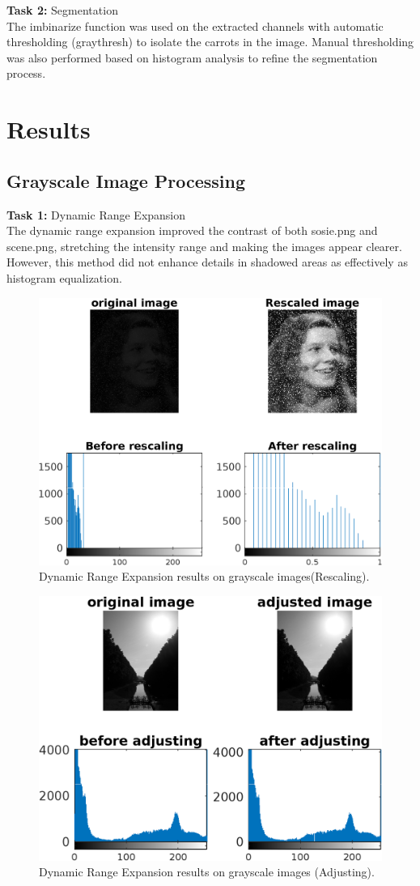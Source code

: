 \documentclass[a4paper,12pt]{article}
\begin{document}
\begin{multicols}{2}
\textbf{Task 2: } Segmentation\\
The imbinarize function was used on the extracted channels with automatic thresholding (graythresh) to isolate the carrots in the image. Manual thresholding was also performed based on histogram analysis to refine the segmentation process.



\section{Results}
\subsection{Grayscale Image Processing}
\textbf{Task 1:} Dynamic Range Expansion\\


The dynamic range expansion improved the contrast of both sosie.png and scene.png, stretching the intensity range and making the images appear clearer. However, this method did not enhance details in shadowed areas as effectively as histogram equalization. 
\begin{figure}[H]
    \centering
    \includegraphics[width=0.50\linewidth]{Images/Figure 1.png} %
    \caption{Dynamic Range Expansion results on grayscale images(Rescaling).}
    \label{fig:dynamic_range_expansion}
\end{figure}
\begin{figure}[H]
    \centering
    \includegraphics[width=0.50\linewidth]{Images/Figure 4.png} %
    \caption{Dynamic Range Expansion results on grayscale images (Adjusting).}
    \label{fig:dynamic_range_expansion}
\end{figure}




\end{multicols}
\end{document}
